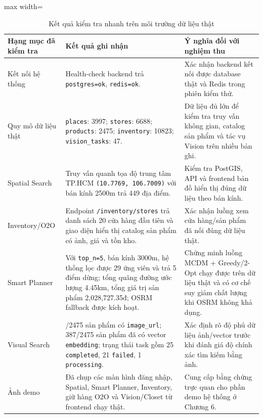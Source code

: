 \documentclass[12pt, a4paper]{article}
\begin{document}
\begin{table}[H]
\centering
\renewcommand{\arraystretch}{1.25}
\small
\begin{adjustbox}{max width=\textwidth}
\begin{tabular}{|>{\raggedright\arraybackslash}p{3.4cm}|>{\raggedright\arraybackslash}p{4.5cm}|>{\raggedright\arraybackslash}p{6.2cm}|}
\hline
\textbf{Hạng mục đã kiểm tra} & \textbf{Kết quả ghi nhận} & \textbf{Ý nghĩa đối với nghiệm thu} \\ \hline
Kết nối hệ thống & Health-check backend trả \texttt{postgres=ok}, \texttt{redis=ok}. & Xác nhận backend kết nối được database thật và Redis trong phiên kiểm thử. \\ \hline
Quy mô dữ liệu thật & \texttt{places}: 3997; \texttt{stores}: 6688; \texttt{products}: 2475; \texttt{inventory}: 10823; \texttt{vision\_tasks}: 47. & Dữ liệu đủ lớn để kiểm tra truy vấn không gian, catalog sản phẩm và tác vụ Vision trên nhiều bản ghi. \\ \hline
Spatial Search & Truy vấn quanh tọa độ trung tâm TP.HCM \texttt{(10.7769, 106.7009)} với bán kính 2500m trả 449 địa điểm. & Kiểm tra PostGIS, API và frontend bản đồ hiển thị đúng dữ liệu theo bán kính. \\ \hline
Inventory/O2O & Endpoint \texttt{/inventory/stores} trả danh sách 20 cửa hàng đầu tiên và giao diện hiển thị catalog sản phẩm có ảnh, giá và tồn kho. & Xác nhận luồng xem cửa hàng/sản phẩm đã nối đúng dữ liệu thật. \\ \hline
Smart Planner & Với \texttt{top\_n=5}, bán kính 3000m, hệ thống lọc được 29 ứng viên và trả 5 điểm dừng; tổng quãng đường ước lượng 4.45km, tổng giá trị sản phẩm 2,028,727.35đ; OSRM fallback được kích hoạt. & Chứng minh luồng MCDM + Greedy/2-Opt chạy được trên dữ liệu thật và có cơ chế suy giảm chất lượng khi OSRM không khả dụng. \\ \hline
Visual Search & 2460/2475 sản phẩm có \texttt{image\_url}; 387/2475 sản phẩm đã có vector \texttt{embedding}; trạng thái task gồm 25 \texttt{completed}, 21 \texttt{failed}, 1 \texttt{processing}. & Xác định rõ độ phủ dữ liệu ảnh/vector trước khi đánh giá độ chính xác tìm kiếm bằng ảnh. \\ \hline
Ảnh demo & Đã chụp các màn hình đăng nhập, Spatial, Smart Planner, Inventory, giữ hàng O2O và Vision/Closet từ frontend chạy thật. & Cung cấp bằng chứng trực quan cho phần demo hệ thống ở Chương 6. \\ \hline
\end{tabular}
\end{adjustbox}
\caption{Kết quả kiểm tra nhanh trên môi trường dữ liệu thật}
\label{tab:runtime_check}
\end{table}
\end{document}
